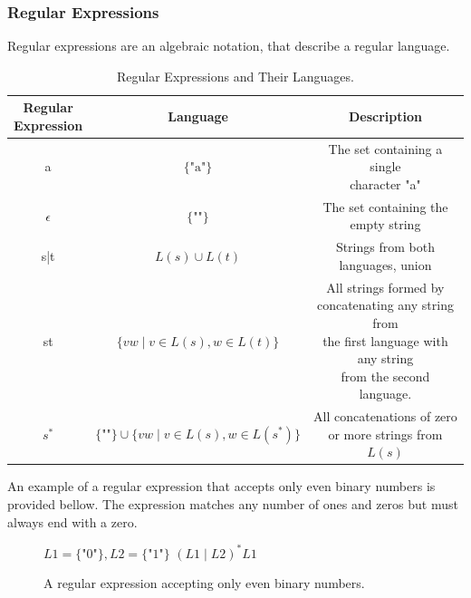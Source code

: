 \subsubsection{Regular Expressions} 

\begin{definition}
  \label{def:regular_exp}
  Regular expressions are an algebraic notation, that describe a regular language. 
  
\begin{table}[ht]
\centering
\begin{tabular}{|ccc|}
\hline
\makecell{\textbf{Regular}\\ \textbf{Expression}} & \textbf{Language} & \textbf{Description} \\ 
\hline
a                          & $\{\text{"a"}\}$          & \makecell{The set containing a single\\ character "a"} \\
\hline
$\epsilon$                  & $\{\text{""}\}$           & The set containing the empty string \\
\hline
s|t                         & $L(s) \cup L(t)$            & Strings from both languages, union \\
\hline
st                          & $\{vw \mid v \in L(s), w \in L(t)\}$ & \makecell{All strings formed by\\ concatenating any string from\\ the first language with any string\\ from the second language.} \\
\hline
$s^*$                         & $\{\text{""}\} \cup \{vw \mid v \in L(s), w \in L(s^*)\}$ & \makecell{All concatenations of zero \\ or more strings from $L(s)$} \\
\hline
\end{tabular}
\caption{Regular Expressions and Their Languages.}
\label{tab:regex}
\end{table}
\end{definition}

An example of a regular expression that accepts only even binary numbers is provided bellow. The expression matches any number of ones and zeros but must always end with a zero.

\begin{figure}[H]
  \label{fig:dfa}
  \centering
  $L1=\{\text{"}0\text{"}\}, L2=\{\text{"}1\text{"}\}$ $(L1\mid L2)^* L1$
  \caption{A regular expression accepting only even binary numbers.}
\end{figure}


